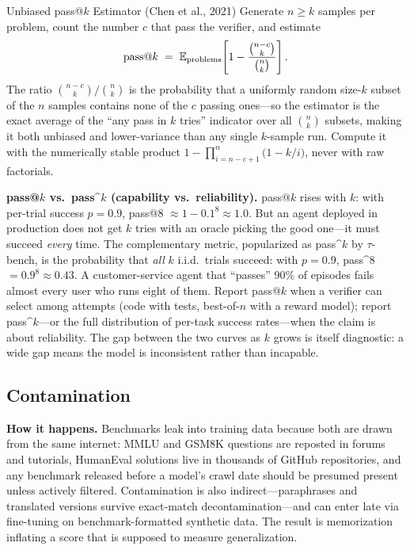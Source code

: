 \begin{mathresult}{Unbiased pass@$k$ Estimator (Chen et al., 2021)}
Generate $n \geq k$ samples per problem, count the number $c$ that pass the verifier, and estimate
\[
\text{pass@}k \;=\; \operatorname{\mathbb{E}}_{\text{problems}}\!\left[ 1 - \frac{\binom{n-c}{k}}{\binom{n}{k}} \right].
\]
The ratio $\binom{n-c}{k} / \binom{n}{k}$ is the probability that a uniformly random size-$k$ subset of the $n$ samples contains none of the $c$ passing ones---so the estimator is the exact average of the ``any pass in $k$ tries'' indicator over all $\binom{n}{k}$ subsets, making it both unbiased and lower-variance than any single $k$-sample run. Compute it with the numerically stable product $1 - \prod_{i=n-c+1}^{n} \bigl(1 - k/i\bigr)$, never with raw factorials.
\end{mathresult}

\textbf{pass@$k$ vs.\ pass\textasciicircum{}$k$ (capability vs.\ reliability).} pass@$k$ rises with $k$: with per-trial success $p = 0.9$, pass@8 $\approx 1 - 0.1^8 \approx 1.0$. But an agent deployed in production does not get $k$ tries with an oracle picking the good one---it must succeed \textit{every} time. The complementary metric, popularized as pass\textasciicircum{}$k$ by $\tau$-bench, is the probability that \textit{all} $k$ i.i.d.\ trials succeed: with $p = 0.9$, pass\textasciicircum{}8 $= 0.9^8 \approx 0.43$. A customer-service agent that ``passes'' 90\% of episodes fails almost every user who runs eight of them. Report pass@$k$ when a verifier can select among attempts (code with tests, best-of-$n$ with a reward model); report pass\textasciicircum{}$k$---or the full distribution of per-task success rates---when the claim is about reliability. The gap between the two curves as $k$ grows is itself diagnostic: a wide gap means the model is inconsistent rather than incapable.

\subsection{Contamination}
\label{sec:contamination}

\textbf{How it happens.} Benchmarks leak into training data because both are drawn from the same internet: MMLU and GSM8K questions are reposted in forums and tutorials, HumanEval solutions live in thousands of GitHub repositories, and any benchmark released before a model's crawl date should be presumed present unless actively filtered. Contamination is also indirect---paraphrases and translated versions survive exact-match decontamination---and can enter late via fine-tuning on benchmark-formatted synthetic data. The result is memorization inflating a score that is supposed to measure generalization.

